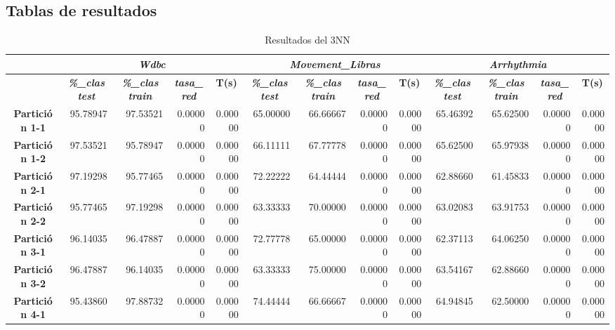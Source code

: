 \documentclass[a4paper,11pt]{article}
\begin{document}
 \subsection{Tablas de resultados}
 \begin{table}[H]	
    \caption*{Resultados del 3NN}
    \begin{adjustbox}{width=1.1\textwidth}
    \begin{tabular}{|c|r|r|r|r|r|r|r|r|r|r|r|r|}
    \hline
    \multicolumn{1}{|l|}{} & \multicolumn{ 4}{c|}{\textbf{\textit{Wdbc}}} & \multicolumn{ 4}{c|}{\textbf{\textit{Movement\_Libras}}} & \multicolumn{ 4}{c|}{\textbf{\textit{Arrhythmia}}} \\ \hline
    & \multicolumn{1}{c|}{\textbf{\textit{\%\_clas test}}} & \multicolumn{1}{c|}{\textbf{\textit{\%\_clas train}}} & \multicolumn{1}{c|}{\textbf{\textit{tasa\_red}}} & \multicolumn{1}{c|}{\textbf{T(s)}} & \multicolumn{1}{c|}{\textbf{\textit{\%\_clas test}}} & \multicolumn{1}{c|}{\textbf{\textit{\%\_clas train}}} & \multicolumn{1}{c|}{\textbf{\textit{tasa\_red}}} & \multicolumn{1}{c|}{\textbf{T(s)}} & \multicolumn{1}{c|}{\textbf{\textit{\%\_clas test}}} & \multicolumn{1}{c|}{\textbf{\textit{\%\_clas train}}} & \multicolumn{1}{c|}{\textbf{\textit{tasa\_red}}} & \multicolumn{1}{c|}{\textbf{T(s)}} \\ \hline
    \textbf{Partición 1-1} & 95.78947 & 97.53521 & 0.00000 & 0.00000 & 65.00000 & 66.66667 & 0.00000 & 0.00000 & 65.46392 & 65.62500 & 0.00000 & 0.00000 \\ \hline
    \textbf{Partición 1-2} & 97.53521 & 95.78947 & 0.00000 & 0.00000 & 66.11111 & 67.77778 & 0.00000 & 0.00000 & 65.62500 & 65.97938 & 0.00000 & 0.00000 \\ \hline
    \textbf{Partición 2-1} & 97.19298 & 95.77465 & 0.00000 & 0.00000 & 72.22222 & 64.44444 & 0.00000 & 0.00000 & 62.88660 & 61.45833 & 0.00000 & 0.00000 \\ \hline
    \textbf{Partición 2-2} & 95.77465 & 97.19298 & 0.00000 & 0.00000 & 63.33333 & 70.00000 & 0.00000 & 0.00000 & 63.02083 & 63.91753 & 0.00000 & 0.00000 \\ \hline
    \textbf{Partición 3-1} & 96.14035 & 96.47887 & 0.00000 & 0.00000 & 72.77778 & 65.00000 & 0.00000 & 0.00000 & 62.37113 & 64.06250 & 0.00000 & 0.00000 \\ \hline
    \textbf{Partición 3-2} & 96.47887 & 96.14035 & 0.00000 & 0.00000 & 63.33333 & 75.00000 & 0.00000 & 0.00000 & 63.54167 & 62.88660 & 0.00000 & 0.00000 \\ \hline
    \textbf{Partición 4-1} & 95.43860 & 97.88732 & 0.00000 & 0.00000 & 74.44444 & 66.66667 & 0.00000 & 0.00000 & 64.94845 & 62.50000 & 0.00000 & 0.00000 \\ \hline

\end{tabular}
\end{adjustbox}
\end{table}
\end{document}
